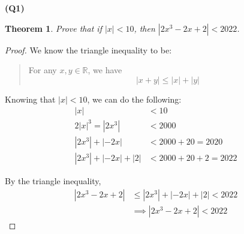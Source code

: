 \documentclass[12pt, a4paper]{article}
\newcommand{\R}{\mathbb{R}}
\newtheorem{theorem}{Theorem}
\begin{document}
\noindent\textbf{(Q1)}
\begin{theorem}
    Prove that if $|x| < 10$, then $|2x^3 - 2x + 2| < 2022$.
\end{theorem}

\begin{proof}
    We know the triangle inequality to be:
    \begin{quote}
        \noindent For any $x,y \in \R$, we have
        \[
            |x + y| \leq |x| + |y|
        \]
    \end{quote}

    Knowing that $|x| < 10$, we can do the following:
    \begin{align*}
        |x| & < 10\\
        2|x|^3 = |2x^3| & < 2000\\
        |2x^3| + |-2x| & < 2000 + 20 = 2020\\
        |2x^3| + |-2x| + |2| & < 2000 + 20 + 2 = 2022
    \end{align*}

    By the triangle inequality,
    \begin{align*}
        |2x^3 - 2x + 2| & \leq |2x^3| + |-2x| + |2| < 2022\\
        & \implies |2x^3 - 2x + 2| < 2022
    \end{align*}
    
\end{proof}
\end{document}
